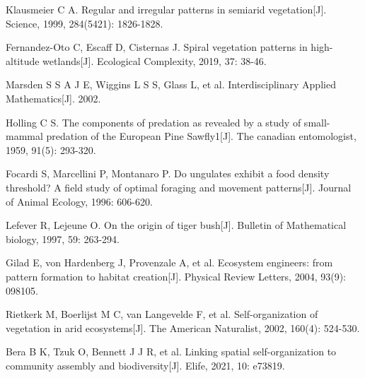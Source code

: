\documentclass[aspectratio=169, 12pt, utf8, mathserif]{ctexbeamer} %
\begin{document}
	

	
\begin{thebibliography}{99}  
	Klausmeier C A. Regular and irregular patterns in semiarid vegetation[J]. Science, 1999, 284(5421): 1826-1828.	 
	
	Fernandez-Oto C, Escaff D, Cisternas J. Spiral vegetation patterns in high-altitude wetlands[J]. Ecological Complexity, 2019, 37: 38-46.	 
	
	Marsden S S A J E, Wiggins L S S, Glass L, et al. Interdisciplinary Applied Mathematics[J]. 2002.	
	
	Holling C S. The components of predation as revealed by a study of small-mammal predation of the European Pine Sawfly1[J]. The canadian entomologist, 1959, 91(5): 293-320.
	
	Focardi S, Marcellini P, Montanaro P. Do ungulates exhibit a food density threshold? A field study of optimal foraging and movement patterns[J]. Journal of Animal Ecology, 1996: 606-620.
	
	Lefever R, Lejeune O. On the origin of tiger bush[J]. Bulletin of Mathematical biology, 1997, 59: 263-294.
	
	Gilad E, von Hardenberg J, Provenzale A, et al. Ecosystem engineers: from pattern formation to habitat creation[J]. Physical Review Letters, 2004, 93(9): 098105.
	
	Rietkerk M, Boerlijst M C, van Langevelde F, et al. Self-organization of vegetation in arid ecosystems[J]. The American Naturalist, 2002, 160(4): 524-530.
	
	Bera B K, Tzuk O, Bennett J J R, et al. Linking spatial self-organization to community assembly and biodiversity[J]. Elife, 2021, 10: e73819.
\end{thebibliography}
\end{document}
